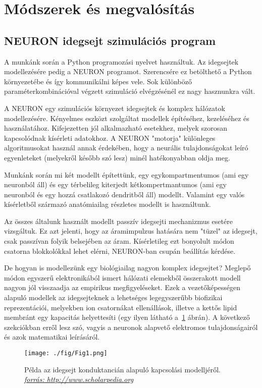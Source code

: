 \section{Módszerek és megvalósítás}

\subsection{NEURON idegsejt szimulációs program}
A munkánk során a Python programozási nyelvet használtuk. Az idegsejtek modellezésére pedig a NEURON programot. Szerencsére ez betölthető a Python környezetébe és így kommunikálni képes vele. Sok különböző paraméterkombinációval végzett szimuláció elvégzésénél ez nagy hasznunkra vált.

A NEURON egy szimulációs környezet idegsejtek és komplex hálózatok modellezésére. Kényelmes eszközt szolgáltat modellek építéséhez, kezeléséhez és használatához. Kifejezetten jól alkalmazható esetekhez, melyek szorosan kapcsolódnak kísérleti adatokhoz. A NEURON "motorja" különleges algoritmusokat használ annak érdekében, hogy a neurális tulajdonságokat leíró egyenleteket (melyekről később szó lesz) minél hatékonyabban oldja meg. 

Munkánk során mi két modellt építettünk, egy egykompartmentumos (ami egy neuronból áll) és egy térbelileg kiterjedt kétkompertmantumos (ami egy neuronból és egy hozzá csatlakozó dendritből áll) modellt. Valamint egy valós kísérletből származó anatómiailag részletes modellt is használtunk.

Az összes általunk használt modellt passzív idegsejti mechanizmus esetére vizsgáltuk. Ez azt jelenti, hogy az áramimpulzus hatására nem "tüzel" az idegsejt, csak passzívan folyik belsejében az áram. Kísérletileg ezt bonyolult módon csatorna blokkolókkal lehet elérni, NEURON-ban csupán beállítás kérdése.

 De hogyan is modellezünk egy biológiailag nagyon komplex idegsejtet? Meglepő módon egyszerű elektronikából ismert hálózati elemekből összerakott modell nagyon jól visszaadja az empirikus megfigyeléseket. Ezek a vezetőképességen alapuló modellek az idegsejteknek a lehetséges legegyszerűbb biofizikai reprezentációi, melyekben ion csatornákat ellenállások, illetve a kettős lipid membránt egy kapacitás helyettesíti (egy ilyen látható a~\ref{fig:fig1} ábrán). A következő szekciókban erről lesz szó, vagyis a neuronok alapvető elektromos tulajdonságairól és azok matematikai leírásáról.

\begin{figure}[!htb]
	\centering
	\texttt{[image: ./fig/Fig1.png]}
	\caption[Idegsejt modell]{Példa az idegsejt konduktancián alapuló kapcsolási modelljéről. \\ \href{http://www.scholarpedia.org/w/images/e/eb/Fig1.png}{\textit{forrás: http://www.scholarpedia.org}}}
		\label{fig:fig1}
\end{figure}





